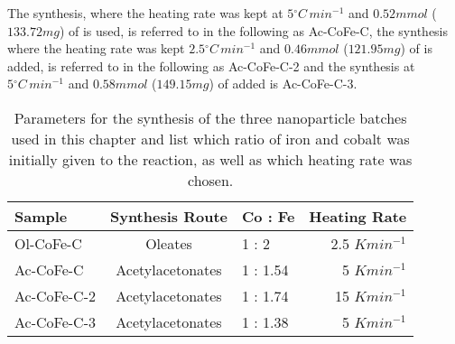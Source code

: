 \documentclass[\main/dresen_thesis.tex]{subfiles}
\begin{document}
    The synthesis, where the heating rate was kept at $5 \unit{^\circ C\,min^{-1}}$ and $0.52 \unit{mmol}$ ($133.72 \unit{mg}$) of   is used, is referred to in the following as Ac-CoFe-C, the synthesis where the heating rate was kept $2.5 \unit{^\circ C\,min^{-1}}$ and $0.46 \unit{mmol}$ ($121.95 \unit{mg}$) of  is added, is referred to in the following as Ac-CoFe-C-2 and the synthesis at $5 \unit{^\circ C\,min^{-1}}$ and $0.58 \unit{mmol}$ ($149.15 \unit{mg}$) of added  is Ac-CoFe-C-3.


    \begin{table}[!htbp]
      \centering
      \caption{\label{tab:monolayers:synthesis:nanoparticles}Parameters for the synthesis of the three nanoparticle batches used in this chapter and list which ratio of iron and cobalt was initially given to the reaction, as well as which heating rate was chosen.}
      \begin{tabular}{ l | c | l | r }
        \textbf{Sample} & \textbf{Synthesis Route} & \textbf{Co : Fe} & \textbf{Heating Rate}\\
        \hline
        Ol-CoFe-C & Oleates & 1 : 2 & 2.5 $\unit{K min^{-1}}$\\
        Ac-CoFe-C & Acetylacetonates & 1 : 1.54 &5 $\unit{K min^{-1}}$\\
        Ac-CoFe-C-2 & Acetylacetonates & 1 : 1.74 &15 $\unit{K min^{-1}}$\\
        Ac-CoFe-C-3 & Acetylacetonates & 1 : 1.38 &5 $\unit{K min^{-1}}$\\
        \hline
      \end{tabular}
    \end{table}
\end{document}
